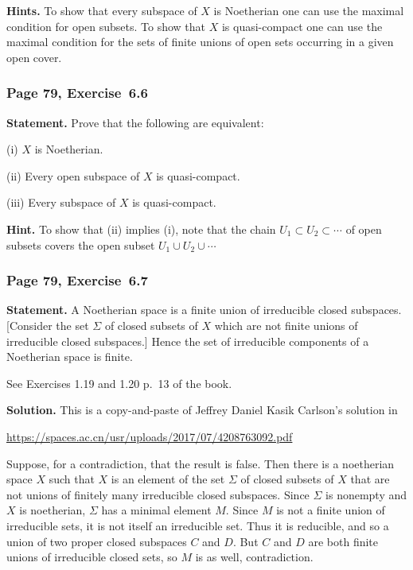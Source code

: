 \documentclass[12pt,letterpaper]{article}%
\newcommand{\nn}{\noindent}
\begin{document}
\nn\textbf{Hints.} To show that every subspace of $X$ is Noetherian one can use the maximal condition for open subsets. To show that $X$ is quasi-compact one can use the maximal condition for the sets of finite unions of open sets occurring in a given open cover.

\subsubsection{Page 79, Exercise~6.6}%

\textbf{Statement.} Prove that the following are equivalent: 

\nn(i) $X$ is Noetherian.

\nn(ii) Every open subspace of $X$ is quasi-compact. 

\nn(iii) Every subspace of $X$ is quasi-compact.


\nn\textbf{Hint.} To show that (ii) implies (i), note that the chain $U_1\subset U_2\subset\cdots$ of open subsets covers the open subset $U_1\cup U_2\cup\cdots$

\subsubsection{Page 79, Exercise~6.7}\label{ex6.7}%

\textbf{Statement.} A Noetherian space is a finite union of irreducible closed subspaces. [Consider the set $\Sigma$ of closed subsets of $X$ which are not finite unions of irreducible closed subspaces.] Hence the set of irreducible components of a Noetherian space is finite.

See Exercises 1.19 and 1.20 p.~13 of the book. 

\nn\textbf{Solution.} This is a copy-and-paste of Jeffrey Daniel Kasik Carlson's solution in\medskip 

\centerline{\href{https://spaces.ac.cn/usr/uploads/2017/07/4208763092.pdf}{https://spaces.ac.cn/usr/uploads/2017/07/4208763092.pdf}}

Suppose, for a contradiction, that the result is false. Then there is a noetherian space $X$ such that $X$ is an element of the set $\Sigma$ of closed subsets of $X$ that are not unions of finitely many irreducible closed subspaces. Since $\Sigma$ is nonempty and $X$ is noetherian, $\Sigma$ has a minimal element $M$. Since $M$ is not a finite union of irreducible sets, it is not itself an irreducible set. Thus it is reducible, and so a union of two proper closed subspaces $C$ and $D$. But $C$ and $D$ are both finite unions of irreducible closed sets, so $M$ is as well, contradiction.
\end{document}
